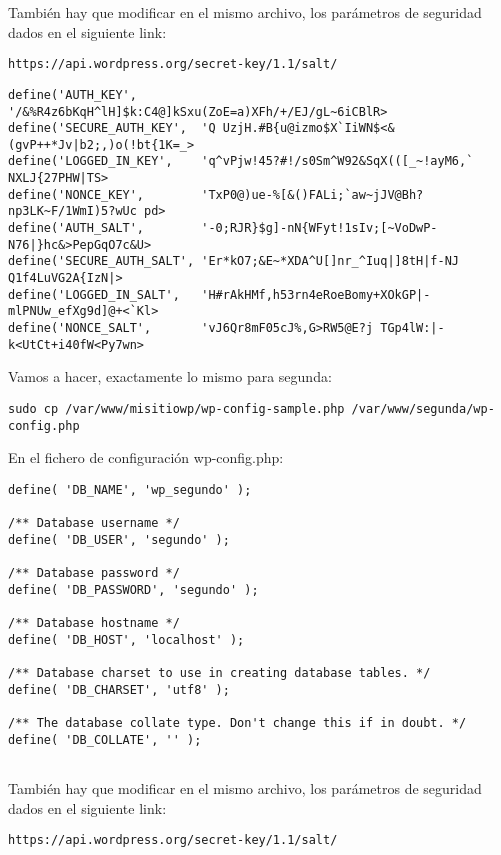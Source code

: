 \documentclass{article}
\begin{document}
También hay que modificar en el mismo archivo, los parámetros de seguridad dados en el siguiente link:
\begin{lstlisting}[frame=single] 
https://api.wordpress.org/secret-key/1.1/salt/
\end{lstlisting}

\begin{lstlisting}[frame=single] 
define('AUTH_KEY',         '/&%R4z6bKqH^lH]$k:C4@]kSxu(ZoE=a)XFh/+/EJ/gL~6iCBlR>
define('SECURE_AUTH_KEY',  'Q UzjH.#B{u@izmo$X`IiWN$<&(gvP++*Jv|b2;,)o(!bt{1K=_>
define('LOGGED_IN_KEY',    'q^vPjw!45?#!/s0Sm^W92&SqX(([_~!ayM6,` NXLJ{27PHW|TS>
define('NONCE_KEY',        'TxP0@)ue-%[&()FALi;`aw~jJV@Bh?np3LK~F/1WmI)5?wUc pd>
define('AUTH_SALT',        '-0;RJR}$g]-nN{WFyt!1sIv;[~VoDwP-N76|}hc&>PepGqO7c&U>
define('SECURE_AUTH_SALT', 'Er*kO7;&E~*XDA^U[]nr_^Iuq|]8tH|f-NJ Q1f4LuVG2A{IzN|>
define('LOGGED_IN_SALT',   'H#rAkHMf,h53rn4eRoeBomy+XOkGP|-mlPNUw_efXg9d]@+<`Kl>
define('NONCE_SALT',       'vJ6Qr8mF05cJ%,G>RW5@E?j TGp4lW:|-k<UtCt+i40fW<Py7wn>

\end{lstlisting}


Vamos a hacer, exactamente lo mismo para segunda:



\begin{lstlisting}[frame=single] 
sudo cp /var/www/misitiowp/wp-config-sample.php /var/www/segunda/wp-config.php
\end{lstlisting}
\begin{flushleft}
En el fichero de configuración wp-config.php:
\end{flushleft}

\begin{lstlisting}[frame=single] 
define( 'DB_NAME', 'wp_segundo' );

/** Database username */
define( 'DB_USER', 'segundo' );

/** Database password */
define( 'DB_PASSWORD', 'segundo' );

/** Database hostname */
define( 'DB_HOST', 'localhost' );

/** Database charset to use in creating database tables. */
define( 'DB_CHARSET', 'utf8' );

/** The database collate type. Don't change this if in doubt. */
define( 'DB_COLLATE', '' );


\end{lstlisting}

También hay que modificar en el mismo archivo, los parámetros de seguridad dados en el siguiente link:
\begin{lstlisting}[frame=single] 
https://api.wordpress.org/secret-key/1.1/salt/
\end{lstlisting}
\end{document}
